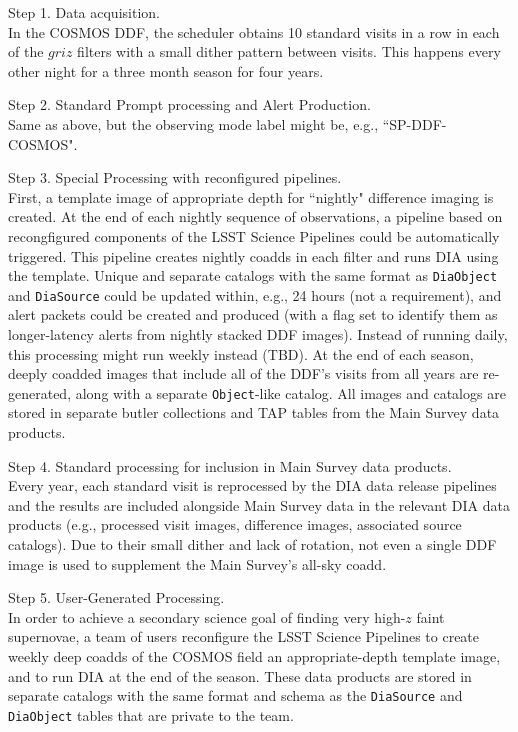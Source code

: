 Step 1. Data acquisition. \\
In the COSMOS DDF, the scheduler obtains 10 standard visits in a row in each of the $griz$ filters
with a small dither pattern between visits.
This happens every other night for a three month season for four years.

Step 2. Standard Prompt processing and Alert Production. \\
Same as above, but the observing mode label might be, e.g., ``SP-DDF-COSMOS".

Step 3. Special Processing with reconfigured pipelines. \\
First, a template image of appropriate depth for ``nightly" difference imaging is created.
At the end of each nightly sequence of observations, a pipeline based on recongfigured 
components of the LSST Science Pipelines could be automatically triggered.
This pipeline creates nightly coadds in each filter and runs DIA using the template.
Unique and separate catalogs with the same format
as {\tt DiaObject} and {\tt DiaSource} could be updated within, e.g., 24 hours (not a requirement),
and alert packets could be created and produced (with a flag set to identify them
as longer-latency alerts from nightly stacked DDF images).
Instead of running daily, this processing might run weekly instead (TBD).
At the end of each season, deeply coadded images that include all of the DDF's visits 
from all years are re-generated, along with a separate {\tt Object}-like catalog.
All images and catalogs are stored in separate butler collections and TAP tables from
the Main Survey data products.

Step 4. Standard processing for inclusion in Main Survey data products. \\
Every year, each standard visit is reprocessed by the DIA data release pipelines
and the results are included alongside Main Survey data in the relevant DIA data products
(e.g., processed visit images, difference images, associated source catalogs).
Due to their small dither and lack of rotation, not even a single DDF image 
is used to supplement the Main Survey's all-sky coadd.

Step 5. User-Generated Processing. \\
In order to achieve a secondary science goal of finding very high-$z$ faint supernovae,
a team of users reconfigure the LSST Science Pipelines to create weekly deep coadds
of the COSMOS field an appropriate-depth template image, and to run DIA at the
end of the season.
These data products are stored in separate catalogs with the same format and schema as
the {\tt DiaSource} and {\tt DiaObject} tables that are private to the team.


